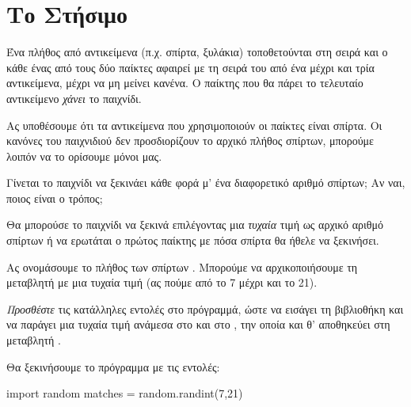 \documentclass[a4paper,11pt,oneside]{book}
\begin{document}
\worksheettrue
\solutionstrue
{}

\section{Το Στήσιμο}

Ένα πλήθος από αντικείμενα (π.χ. σπίρτα, ξυλάκια) τοποθετούνται στη σειρά και ο κάθε ένας από τους δύο παίκτες αφαιρεί με τη σειρά του από ένα μέχρι και τρία αντικείμενα, μέχρι να μη μείνει κανένα. Ο παίκτης που θα πάρει το τελευταίο αντικείμενο \emph{χάνει} το παιχνίδι. 

\begin{step}

Ας υποθέσουμε ότι τα αντικείμενα που χρησιμοποιούν οι παίκτες είναι σπίρτα. Οι κανόνες του παιχνιδιού δεν προσδιορίζουν το αρχικό πλήθος σπίρτων, μπορούμε λοιπόν να το ορίσουμε μόνοι μας. 

Γίνεται το παιχνίδι να ξεκινάει κάθε φορά μ' ένα διαφορετικό αριθμό σπίρτων; Αν ναι, ποιος είναι ο τρόπος;

\begin{answer}
Θα μπορούσε το παιχνίδι να ξεκινά επιλέγοντας μια \emph{τυχαία} τιμή ως αρχικό αριθμό σπίρτων ή να ερωτάται ο πρώτος παίκτης με πόσα σπίρτα θα ήθελε να ξεκινήσει. 
\end{answer}

Ας ονομάσουμε το πλήθος των σπίρτων . Μπορούμε να αρχικοποιήσουμε τη μεταβλητή  με μια τυχαία τιμή (ας πούμε από το 7 μέχρι και το 21).

\emph{Προσθέστε} τις κατάλληλες εντολές στο πρόγραμμά, ώστε να εισάγει τη βιβλιοθήκη  και να παράγει μια τυχαία τιμή ανάμεσα στο  και στο , την οποία και θ' αποθηκεύει στη μεταβλητή .

\begin{answer}
Θα ξεκινήσουμε το πρόγραμμα με τις εντολές:

\begin{pynew}
import random
matches = random.randint(7,21)
\end{pynew}
\end{answer}
\end{step}
\end{document}

